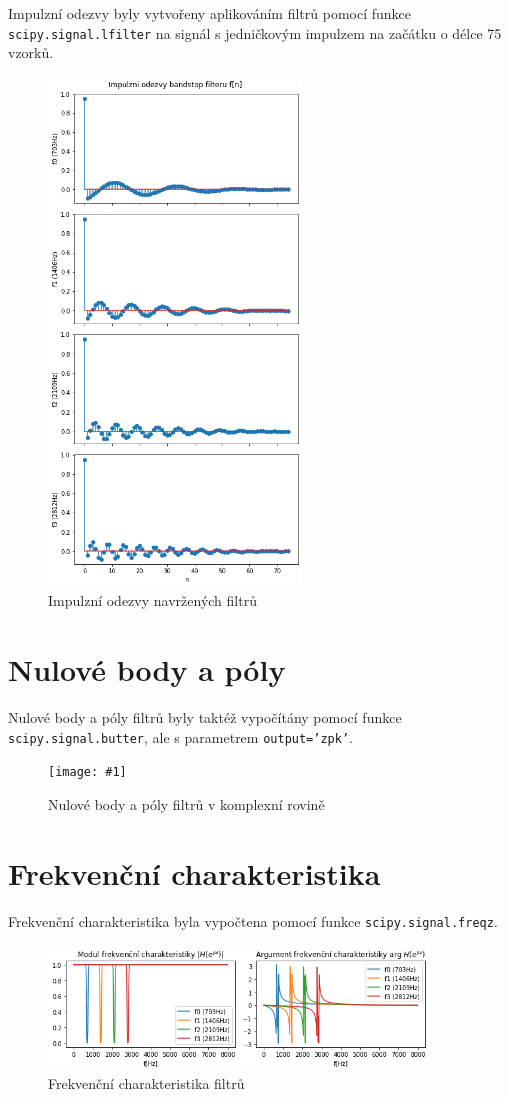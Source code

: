 \documentclass[11pt]{article}
\newcommand{\pic}[2]{
    \begin{figure}[h!]
    \centering
    \texttt{[image: \#1]}
    \caption{#2}
    \end{figure}
}
\begin{document}
Impulzní odezvy byly vytvořeny aplikováním filtrů pomocí funkce \texttt{scipy.signal.lfilter} na signál s jedničkovým impulzem na začátku o délce 75 vzorků.
\begin{figure}[h!]
\centering
\includegraphics[width=0.6\textwidth]{img/7_impulse.png}
\caption{Impulzní odezvy navržených filtrů}
\end{figure}

\section{Nulové body a póly}
Nulové body a póly filtrů byly taktéž vypočítány pomocí funkce \texttt{scipy.signal.butter}, ale s parametrem \texttt{output='zpk'}.
\pic{img/8_coefs.png}{Nulové body a póly filtrů v komplexní rovině}

\section{Frekvenční charakteristika}
Frekvenční charakteristika byla vypočtena pomocí funkce \texttt{scipy.signal.freqz}.
\begin{figure}[h!]
\centering
\includegraphics[width=0.9\textwidth]{img/9_freq_char.png}
\caption{Frekvenční charakteristika filtrů}
\end{figure}
\end{document}
